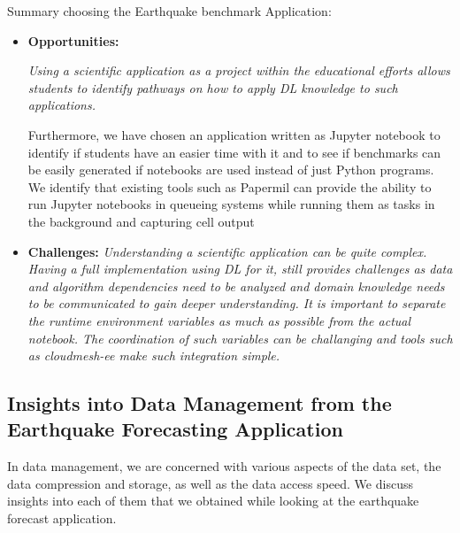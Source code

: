 \begin{tcolorbox}
Summary choosing the Earthquake benchmark Application:

\begin{itemize}
\item {\bf Opportunities:} {\it Using a scientific application as a project within the educational efforts allows students to identify pathways on how to apply DL knowledge to such applications.

Furthermore, we have chosen an application written as Jupyter notebook to identify if students have an easier time with it and to see if benchmarks can be easily generated if notebooks are used instead of just Python programs. We identify that existing tools such as Papermil can provide the ability to run Jupyter notebooks in queueing systems while running them as tasks in the background and capturing cell output}

\item {\bf Challenges:} {\it Understanding a scientific application can be quite complex. Having a full implementation using DL for it, still provides challenges as data and algorithm dependencies need to be analyzed and domain knowledge needs to be communicated to gain deeper understanding. It is important to separate the runtime environment variables as much as possible from the actual notebook. The coordination of such variables can be challanging and tools such as cloudmesh-ee make such integration simple.}
\end{itemize}
\end{tcolorbox}






\subsection{Insights into Data Management from the Earthquake Forecasting Application}
\label{sec:eq-data}

In data management, we are concerned with various aspects of the data set, the data compression and storage, as well as the data access speed. We discuss insights into each of them that we obtained while looking at the earthquake forecast application.

